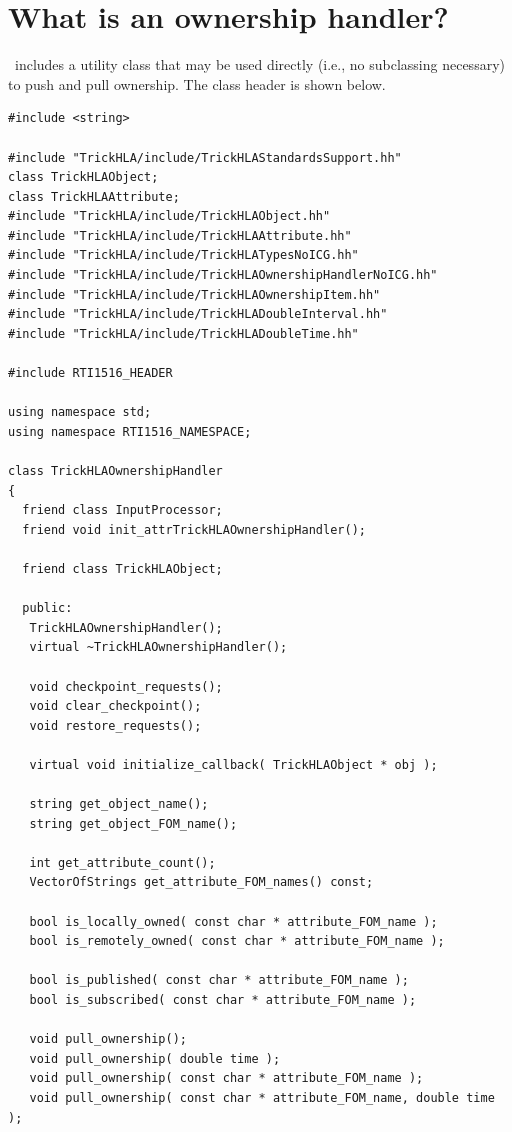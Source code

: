 \section{What is an ownership handler?}

\TrickHLA\ includes a utility class that may be used directly
(i.e., no subclassing necessary)
to push and pull ownership.
The class header is shown below.

\begin{lstlisting}[caption={{\tt TrickHLAOwnershipHandler} class header}]
#include <string>

#include "TrickHLA/include/TrickHLAStandardsSupport.hh"
class TrickHLAObject;
class TrickHLAAttribute;
#include "TrickHLA/include/TrickHLAObject.hh"
#include "TrickHLA/include/TrickHLAAttribute.hh"
#include "TrickHLA/include/TrickHLATypesNoICG.hh"
#include "TrickHLA/include/TrickHLAOwnershipHandlerNoICG.hh"
#include "TrickHLA/include/TrickHLAOwnershipItem.hh"
#include "TrickHLA/include/TrickHLADoubleInterval.hh"
#include "TrickHLA/include/TrickHLADoubleTime.hh"

#include RTI1516_HEADER

using namespace std;
using namespace RTI1516_NAMESPACE;

class TrickHLAOwnershipHandler
{
  friend class InputProcessor;
  friend void init_attrTrickHLAOwnershipHandler();

  friend class TrickHLAObject;
  
  public:
   TrickHLAOwnershipHandler();
   virtual ~TrickHLAOwnershipHandler();

   void checkpoint_requests();
   void clear_checkpoint();
   void restore_requests();
   
   virtual void initialize_callback( TrickHLAObject * obj );

   string get_object_name();
   string get_object_FOM_name();

   int get_attribute_count();
   VectorOfStrings get_attribute_FOM_names() const;

   bool is_locally_owned( const char * attribute_FOM_name );
   bool is_remotely_owned( const char * attribute_FOM_name );

   bool is_published( const char * attribute_FOM_name );
   bool is_subscribed( const char * attribute_FOM_name );

   void pull_ownership();
   void pull_ownership( double time );
   void pull_ownership( const char * attribute_FOM_name );
   void pull_ownership( const char * attribute_FOM_name, double time );


\end{lstlisting}
